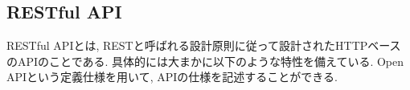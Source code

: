 \documentclass[../../../main]{subfiles}
\begin{document}
    \subsection{RESTful API}\label{subsec:phraseology-restful-api}

    RESTful APIとは, RESTと呼ばれる設計原則に従って設計されたHTTPベースのAPIのことである. 具体的には大まかに以下のような特性を備えている.
    Open APIという定義仕様を用いて, APIの仕様を記述することができる.
\end{document}

